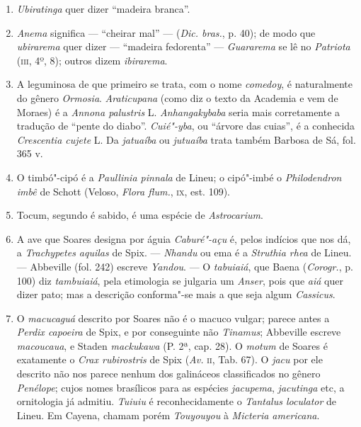 \begin{enumerate}
\item \textit{Ubiratinga} quer dizer ``madeira branca''.

\item \textit{Anema} significa --- ``cheirar mal'' --- (\textit{Dic. bras.}, p. 40); de modo que \textit{ubirarema} quer 
dizer --- ``madeira fedorenta'' ---  \textit{Guararema} se lê no \textit{Patriota}
(\textsc{iii}, 4º, 8); outros dizem \textit{ibirarema}.

\item A leguminosa de que primeiro se trata, com o nome \textit{comedoy}, é naturalmente do 
gênero \textit{Ormosia}. \textit{Araticupana} (como diz o texto da Academia e vem de Moraes) 
é a  \textit{Annona palustris} L. \textit{Anhangakybaba} seria mais corretamente a tradução de ``pente 
do diabo''. \textit{Cuié"-yba}, ou ``árvore das cuias'', é a conhecida \textit{Crescentia cujete} L.
Da  \textit{jatuaíba} ou \textit{jutuaíba} trata também Barbosa de Sá, fol. 365 v.

\item O timbó"-cipó é a \textit{Paullinia pinnala} de Lineu; o cipó"-imbé o \textit{Philodendron imbê} 
de Schott (Veloso, \textit{Flora flum.}, \textsc{ix}, est. 109).

\item Tocum, segundo é sabido, é uma espécie de \textit{Astrocarium}.

\item A ave que Soares designa por águia \textit{Caburé"-açu} é, pelos indícios que nos dá, 
a  \textit{Trachypetes aquilas} de Spix. --- \textit{Nhandu} ou ema é a \textit{Struthia rhea} de Lineu. --- 
Abbeville (fol. 242) escreve \textit{Yandou}. --- O \textit{tabuiaiá}, que Baena
(\textit{Corogr.}, p. 100) diz \textit{tambuiaiá}, pela etimologia se julgaria um \textit{Anser}, pois que \textit{aiá} quer dizer 
pato; mas a descrição conforma"-se mais a que seja algum \textit{Cassicus}.

\item  O \textit{macucaguá} descrito por Soares não é o macuco vulgar; parece
antes a \textit{Perdix capoeira} de Spix, e por conseguinte não \textit{Tinamus}; Abbeville
escreve \textit{macoucaua}, e Staden \textit{mackukawa} (P. 2ª, cap. 28).
O \textit{motum} de Soares é exatamente o \textit{Crax rubirostris} de Spix (\textit{Av.} \textsc{ii}, Tab. 67). O \textit{jacu} 
por ele descrito não nos parece nenhum dos galináceos classificados no gênero \textit{Penélope}; 
cujos nomes brasílicos para as espécies \textit{jacupema}, \textit{jacutinga} etc, a ornitologia já admitiu.
\textit{Tuiuiu} é reconhecidamente o \textit{Tantalus loculator} de Lineu. Em Cayena, chamam porém  \textit{Touyouyou} à \textit{Micteria 
americana}.


\end{enumerate}
